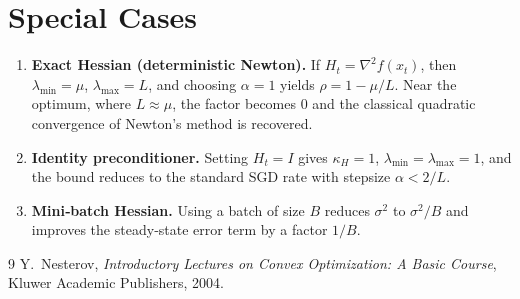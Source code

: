 \documentclass[11pt]{article}
\begin{document}
\section*{Special Cases}
\begin{enumerate}[leftmargin=*]
\item \textbf{Exact Hessian (deterministic Newton).} If $H_{t}=\nabla^{2}f(x_{t})$, then $\lambda_{\min}=\mu$, $\lambda_{\max}=L$, and choosing $\alpha=1$ yields $\rho=1-\mu/L$. Near the optimum, where $L\approx\mu$, the factor becomes $0$ and the classical quadratic convergence of Newton’s method is recovered.
\item \textbf{Identity preconditioner.} Setting $H_{t}=I$ gives $\kappa_{H}=1$, $\lambda_{\min}=\lambda_{\max}=1$, and the bound reduces to the standard SGD rate with stepsize $\alpha<2/L$.
\item \textbf{Mini‑batch Hessian.} Using a batch of size $B$ reduces $\sigma^{2}$ to $\sigma^{2}/B$ and improves the steady‑state error term by a factor $1/B$.
\end{enumerate}

\begin{thebibliography}{9}
Y.~Nesterov, \emph{Introductory Lectures on Convex Optimization: A Basic
  Course}, Kluwer Academic Publishers, 2004.
\end{thebibliography}
\end{document}

